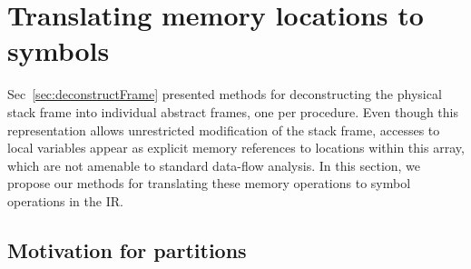 \section{Translating memory locations to symbols}
\label{sec:symprom}
Sec~\ref{sec:deconstructFrame} presented methods for deconstructing the physical stack frame into individual abstract frames, one per procedure. Even though this representation allows unrestricted modification of the stack frame, accesses to local variables appear as explicit memory references to locations within this array, which are not amenable to standard data-flow analysis. In this section, we propose our methods for translating these memory operations to symbol operations in the IR.

                                                                        


\subsection{Motivation for partitions}

